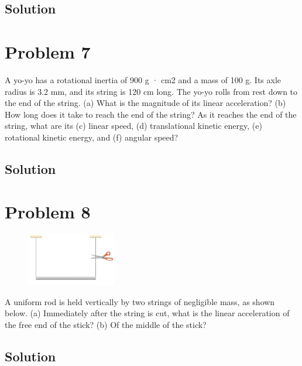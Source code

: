 \documentclass[12pt]{article}
\begin{document}
\subsection{Solution}


\pagebreak

\section{Problem 7}
A yo-yo has a rotational inertia of 900 g · cm2 and a mass of 100 g. Its axle radius is 3.2 mm, and its string is 120 cm long. The yo-yo rolls from rest down to the end of the string. (a) What is the magnitude of its linear acceleration? (b) How long does it take to reach the end of the string? As it reaches the end of the string, what are its (c) linear speed, (d) translational kinetic energy, (e) rotational kinetic energy, and (f) angular speed?

\subsection{Solution}


\pagebreak

\section{Problem 8}
\begin{figure}
    \vspace{-30pt}
    \includegraphics[width=0.35\textwidth]{graph_8.png} 
\end{figure}
A uniform rod is held vertically by two strings of negligible mass, as shown below. (a) Immediately after the string is cut, what is the linear acceleration of the free end of the stick? (b) Of the middle of the stick?

\subsection{Solution}
\end{document}
